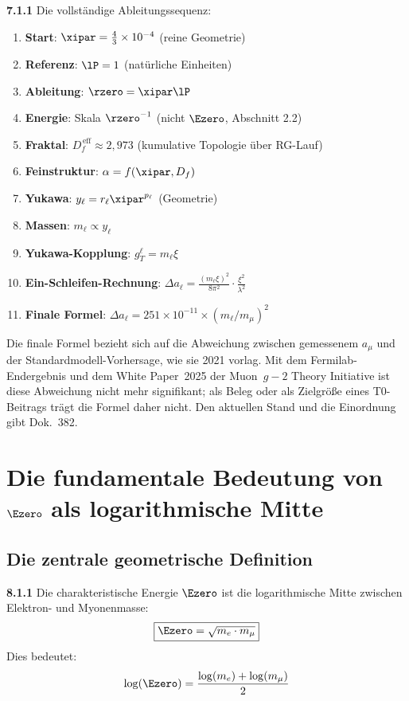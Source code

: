 	\noindent \textbf{7.1.1} Die vollständige Ableitungssequenz:
	\begin{enumerate}
		\item \textbf{Start}: $\xipar = \frac{4}{3} \times 10^{-4}$ (reine Geometrie)
		\item \textbf{Referenz}: $\lP = 1$ (natürliche Einheiten)
		\item \textbf{Ableitung}: $\rzero = \xipar \lP$
		\item \textbf{Energie}: Skala $\rzero^{-1}$ (nicht $\Ezero$, Abschnitt 2.2)
		\item \textbf{Fraktal}: $D_f^{\,\text{eff}} \approx 2{,}973$ (kumulative Topologie über RG-Lauf)
		\item \textbf{Feinstruktur}: $\alpha = f(\xipar, D_f)$
		\item \textbf{Yukawa}: $y_\ell = r_\ell \xipar^{p_\ell}$ (Geometrie)
		\item \textbf{Massen}: $m_\ell \propto y_\ell$
		\item \textbf{Yukawa-Kopplung}: $g_T^\ell = m_\ell \xi$
		\item \textbf{Ein-Schleifen-Rechnung}: $\Delta a_\ell = \frac{(m_\ell \xi)^2}{8\pi^2} \cdot \frac{\xi^2}{\lambda^2}$
		\item \textbf{Finale Formel}: $\Delta a_\ell = 251 \times 10^{-11} \times (m_\ell/m_\mu)^2$
	\end{enumerate}
	
	Die finale Formel bezieht sich auf die Abweichung zwischen gemessenem $a_\mu$ und der Standardmodell-Vorhersage, wie sie 2021 vorlag. Mit dem Fermilab-Endergebnis und dem White Paper~2025 der Muon~$g-2$ Theory Initiative ist diese Abweichung nicht mehr signifikant; als Beleg oder als Zielgröße eines T0-Beitrags trägt die Formel daher nicht. Den aktuellen Stand und die Einordnung gibt Dok.~382.

\section{Die fundamentale Bedeutung von $\Ezero$ als logarithmische Mitte}

\subsection{Die zentrale geometrische Definition}

\begin{tcolorbox}[colback=yellow!10!white,colframe=red!75!black,title=Fundamentale Definition]
	\noindent \textbf{8.1.1} Die charakteristische Energie $\Ezero$ ist die logarithmische Mitte zwischen Elektron- und Myonenmasse:
	\begin{equation}
		\boxed{\Ezero = \sqrt{m_e \cdot m_\mu}}
		\label{eq:E0_fundamental}
	\end{equation}
	Dies bedeutet:
	\begin{equation}
		\log(\Ezero) = \frac{\log(m_e) + \log(m_\mu)}{2}
		\label{eq:E0_logarithmic}
	\end{equation}
\end{tcolorbox}

